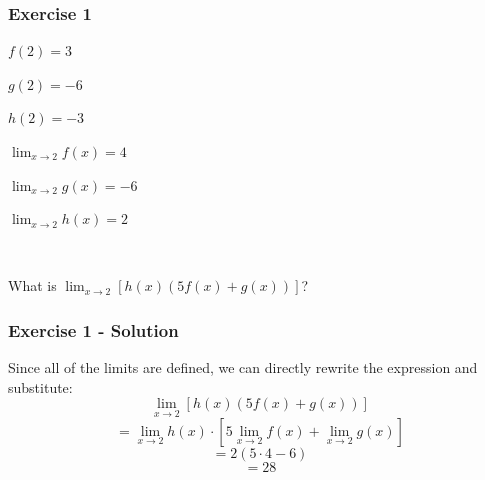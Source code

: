 \documentclass[12pt]{beamer}
\begin{document}
\begin{frame}
	\frametitle{Exercise 1}
	\vspace*{\fill}
	\vspace*{\fill}
	\initclock
	\large
	\begin{minipage}{0.5\textwidth} %
		\begin{center} %
			$f(2) = 3$\par
			$g(2) = -6$\par
			$h(2) = -3$
		\end{center}
	\end{minipage}%
	\begin{minipage}{0.5\textwidth}
		\begin{center}
			$\displaystyle\lim_{x\to2}f(x) = 4$\par
			$\displaystyle\lim_{x\to2}g(x) = -6$\par
			$\displaystyle\lim_{x\to2}h(x) = 2$ %
		\end{center}
	\end{minipage}\\
	\vspace*{\fill}
	\begin{center}
		What is $\displaystyle\lim_{x\to2}[h(x)(5f(x)+g(x))]$?\\
	\end{center}
	\vspace*{\fill}
	\vspace*{\fill}
	\crono
\end{frame}
\begin{frame}
	\frametitle{Exercise 1 - Solution}
	Since all of the limits are defined, we can directly rewrite the expression and substitute:
	\[\displaystyle\lim_{x\to2}[h(x)(5f(x)+g(x))]\]
	\[= \displaystyle\lim_{x\to2}h(x)\cdot\left[5\displaystyle\lim_{x\to2}f(x)+\displaystyle\lim_{x\to2}g(x)\right]\]
	\[= 2(5\cdot4 - 6)\]
	\[= \boxed{28}\]

\end{frame}
\end{document}

